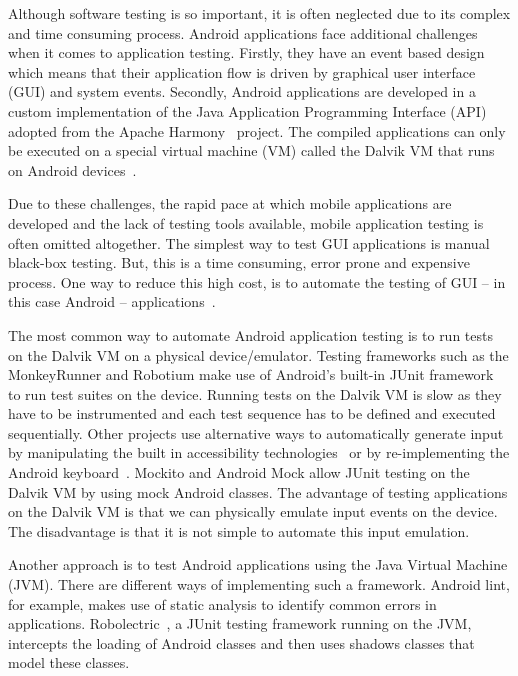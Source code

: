 \documentclass{acm_proc_article-sp}
\begin{document}
Although software testing is so important, it is often neglected due to its complex and time consuming process. Android
applications face additional challenges when it comes to application testing. Firstly, they have an event based design which means that
their application flow is driven by graphical user interface (GUI) and system events. Secondly, Android applications are developed in a
custom implementation of the Java Application Programming Interface (API)  adopted from the Apache Harmony~\cite{harmony} project. The
compiled applications can only be executed on a special virtual machine (VM) called the Dalvik VM that runs on Android
devices~\cite{dalvik}.

Due to these challenges, the rapid pace at which mobile applications are developed and the lack of testing tools available, mobile
application testing is often omitted altogether. The simplest way to test GUI applications is manual black-box testing.
But, this is a time consuming, error prone and expensive~\cite{AccessibilityTech} process. One way to reduce this high cost, is to  automate
the testing of GUI -- in this case Android -- applications~\cite{AccessibilityTech}.

The most common way to automate Android application testing is to run tests on the Dalvik VM on a
physical device/emulator. Testing frameworks such as the MonkeyRunner and Robotium make use of Android's built-in JUnit
framework~\cite{TestingAndroid} to run test suites on the device. Running tests on the Dalvik VM is slow as they have to be instrumented and
each test sequence has to be defined and executed sequentially. Other projects use alternative ways to automatically generate input by
manipulating the built in accessibility technologies~\cite{AccessibilityTech} or by re-implementing the Android
keyboard~\cite{KeyboardModel}. Mockito and Android Mock allow JUnit testing on the Dalvik VM by using mock Android classes. The advantage of
testing applications on the Dalvik VM is that we can physically emulate input events on the device. The disadvantage is that it is not
simple to automate this input emulation. 

Another approach is to test Android applications using the Java Virtual Machine (JVM). There are different ways of implementing such
a framework. Android lint, for example, makes use of static analysis to identify common errors in applications.
Robolectric~\cite{robolectric}, a JUnit testing framework running on the JVM,  intercepts the loading of Android classes and then uses
shadows classes that model these classes.
\end{document}

